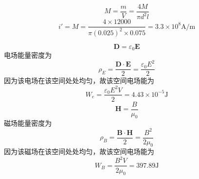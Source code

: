 \documentclass{phyasgn}
\begin{document}
\begin{sol}[4-25]
    $$M=\frac{m}{V}=\frac{4M}{\pi d^2l}$$
    $$i'=M=\frac{4\times 12000}{\pi(0.025)^2\times0.075}=3.3\times 10^8\text{A/m}$$
\end{sol}\par

\begin{sol}[4-66]
    $$\mathbf{D}=\varepsilon_0\mathbf{E}$$
    电场能量密度为
    $$\rho_E=\frac{\mathbf{D}\cdot \mathbf{E}}{2}=\frac{\varepsilon_0E^2}{2}$$
    因为该电场在该空间处处均匀，故该空间电场能为
    $$W_e=\frac{\varepsilon_0E^2V}{2}=4.43\times 10^{-5}\text{J}$$
    $$\mathbf{H}=\frac{B}{\mu_0}$$
    磁场能量密度为
    $$\rho_B=\frac{\mathbf{B}\cdot \mathbf{H}}{2}=\frac{B^2}{2\mu_0}$$
    因为该磁场在该空间处处均匀，故该空间电场能为
    $$W_B=\frac{B^2V}{2\mu_0}=397.89\text{J}$$
\end{sol}\par
\end{document}
